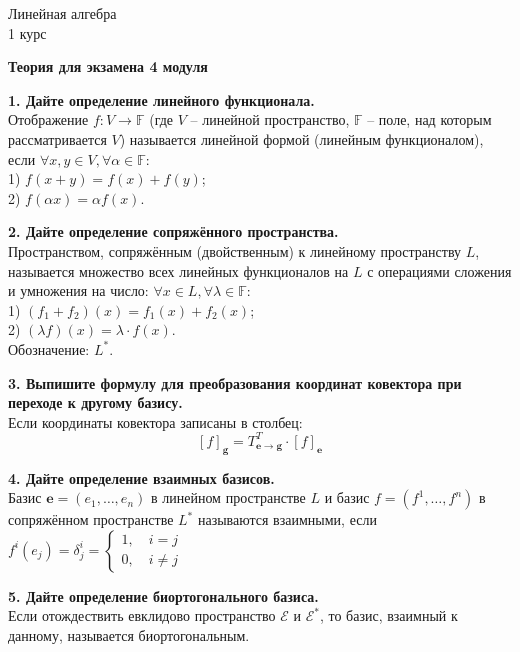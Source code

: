 \documentclass[11pt,a4paper]{article}
\newcommand{\F}{\mathbb{F}}
\newcommand{\e}{\mathbf{e}}
\newcommand{\g}{\mathbf{g}}
\begin{document}
\begin{center}

\begin{huge}
\textsf{Линейная алгебра\\1 курс}
\end{huge}

\vspace{5mm}

\begin{LARGE}
\textsf{\textbf{Теория для экзамена 4 модуля}}
\end{LARGE}

\end{center}

\textbf{1. Дайте определение линейного функционала.\\}
Отображение $f : V \rightarrow \mathbb{F}$ (где $V$ -- линейной пространство, $\F$ -- поле, над которым рассматривается $V$) называется линейной формой (линейным функционалом), если $\forall x, y \in V, \forall \alpha \in \F$:\\
1) $f (x + y) = f(x) + f(y)$;\\
2) $f (\alpha x) = \alpha f(x)$.

\textbf{2. Дайте определение сопряжённого пространства.\\}
Пространством, сопряжённым (двойственным) к линейному пространству $L$, называется множество всех линейных функционалов на $L$ с операциями сложения и умножения на число: $\forall x \in L, \forall \lambda \in \F$:\\
1) $(f_1 + f_2) (x) = f_1 (x) + f_2 (x)$;\\
2) $(\lambda f) (x) = \lambda \cdot f(x)$.\\
Обозначение: $L^*$.

\textbf{3. Выпишите формулу для преобразования координат ковектора при переходе к другому базису.\\}
Если координаты ковектора записаны в столбец: $$[f]_\g = T_{\e \rightarrow \g}^T \cdot [f]_\e$$

\textbf{4. Дайте определение взаимных базисов.\\}
Базис $\e = (e_1, \hdots, e_n)$ в линейном пространстве $L$ и базис $f = (f^1, \hdots, f^n)$ в сопряжённом пространстве $L^*$ называются взаимными, если $f^i (e_j) = \delta_j^i = \begin{cases*}
1, \quad i = j\\
0, \quad i \neq j
\end{cases*}$

\textbf{5. Дайте определение биортогонального базиса.\\}
Если отождествить евклидово пространство $\mathcal{E}$ и $\mathcal{E}^*$, то базис, взаимный к данному, называется биортогональным.
\end{document}
